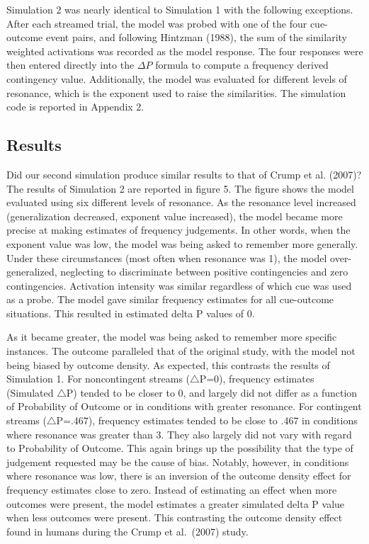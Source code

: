 \documentclass[
  english,
  man,floatsintext]{apa6}
\begin{document}
Simulation 2 was nearly identical to Simulation 1 with the following exceptions. After each streamed trial, the model was probed with one of the four cue-outcome event pairs, and following Hintzman (1988), the sum of the similarity weighted activations was recorded as the model response. The four responses were then entered directly into the \(\Delta P\) formula to compute a frequency derived contingency value. Additionally, the model was evaluated for different levels of resonance, which is the exponent used to raise the similarities. The simulation code is reported in Appendix 2.

\hypertarget{results-1}{%
\subsection{Results}\label{results-1}}

Did our second simulation produce similar results to that of Crump et al. (2007)? The results of Simulation 2 are reported in figure 5. The figure shows the model evaluated using six different levels of resonance. As the resonance level increased (generalization decreased, exponent value increased), the model became more precise at making estimates of frequency judgements. In other words, when the exponent value was low, the model was being asked to remember more generally. Under these circumstances (most often when resonance was 1), the model over-generalized, neglecting to discriminate between positive contingencies and zero contingencies. Activation intensity was similar regardless of which cue was used as a probe. The model gave similar frequency estimates for all cue-outcome situations. This resulted in estimated delta P values of 0.

As it became greater, the model was being asked to remember more specific instances. The outcome paralleled that of the original study, with the model not being biased by outcome density. As expected, this contrasts the results of Simulation 1. For noncontingent streams (\(\triangle\)P=0), frequency estimates (Simulated \(\triangle\)P) tended to be closer to 0, and largely did not differ as a function of Probability of Outcome or in conditions with greater resonance. For contingent streams (\(\triangle\)P=.467), frequency estimates tended to be close to .467 in conditions where resonance was greater than 3. They also largely did not vary with regard to Probability of Outcome. This again brings up the possibility that the type of judgement requested may be the cause of bias. Notably, however, in conditions where resonance was low, there is an inversion of the outcome density effect for frequency estimates close to zero. Instead of estimating an effect when more outcomes were present, the model estimates a greater simulated delta P value when less outcomes were present. This contrasting the outcome density effect found in humans during the Crump et al.~(2007) study.
\end{document}
